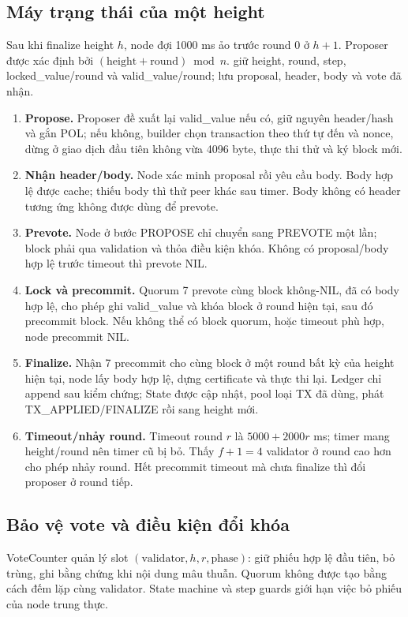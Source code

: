 \documentclass[11pt,a4paper]{article}
\newcommand{\code}[1]{\texttt{\detokenize{#1}}}
\newcommand{\key}[1]{\textbf{\color{navy}#1}}
\begin{document}
\subsection{Máy trạng thái của một height}
Sau khi finalize height $h$, node đợi 1000 ms ảo trước round 0 ở $h+1$. Proposer được xác định bởi $(\text{height}+\text{round})\bmod n$. \code{Consensus} giữ height, round, step, locked\_value/round và valid\_value/round; \code{View} lưu proposal, header, body và vote đã nhận.

\begin{enumerate}
\item \key{Propose.} Proposer đề xuất lại valid\_value nếu có, giữ nguyên header/hash và gắn POL; nếu không, builder chọn transaction theo thứ tự đến và nonce, dừng ở giao dịch đầu tiên không vừa 4096 byte, thực thi thử và ký block mới.
\item \key{Nhận header/body.} Node xác minh proposal rồi yêu cầu body. Body hợp lệ được cache; thiếu body thì thử peer khác sau timer. Body không có header tương ứng không được dùng để prevote.
\item \key{Prevote.} Node ở bước PROPOSE chỉ chuyển sang PREVOTE một lần; block phải qua validation và thỏa điều kiện khóa. Không có proposal/body hợp lệ trước timeout thì prevote NIL.
\item \key{Lock và precommit.} Quorum 7 prevote cùng block không-NIL, đã có body hợp lệ, cho phép ghi valid\_value và khóa block ở round hiện tại, sau đó precommit block. Nếu không thể có block quorum, hoặc timeout phù hợp, node precommit NIL.
\item \key{Finalize.} Nhận 7 precommit cho cùng block ở một round bất kỳ của height hiện tại, node lấy body hợp lệ, dựng certificate và thực thi lại. Ledger chỉ append sau kiểm chứng; State được cập nhật, pool loại TX đã dùng, phát TX\_APPLIED/FINALIZE rồi sang height mới.
\item \key{Timeout/nhảy round.} Timeout round $r$ là $5000+2000r$ ms; timer mang height/round nên timer cũ bị bỏ. Thấy $f+1=4$ validator ở round cao hơn cho phép nhảy round. Hết precommit timeout mà chưa finalize thì đổi proposer ở round tiếp.
\end{enumerate}

\subsection{Bảo vệ vote và điều kiện đổi khóa}
VoteCounter quản lý slot $(\text{validator},h,r,\text{phase})$: giữ phiếu hợp lệ đầu tiên, bỏ trùng, ghi bằng chứng khi nội dung mâu thuẫn. Quorum không được tạo bằng cách đếm lặp cùng validator. State machine và step guards giới hạn việc bỏ phiếu của node trung thực.
\end{document}
